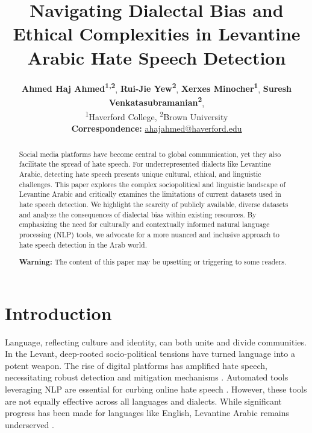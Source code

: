 \documentclass[11pt]{article}
\title{Navigating Dialectal Bias and Ethical Complexities in Levantine Arabic Hate Speech Detection}
\author{
 \textbf{Ahmed Haj Ahmed\textsuperscript{1,2}},
 \textbf{Rui-Jie Yew\textsuperscript{2}},
 \textbf{Xerxes Minocher\textsuperscript{1}},
 \textbf{Suresh Venkatasubramanian\textsuperscript{2}},
\\
 \textsuperscript{1}Haverford College,
 \textsuperscript{2}Brown University
\\
 \small{
   \textbf{Correspondence:} \href{mailto:ahajahmed@haverford.edu}{ahajahmed@haverford.edu}
 }
}
\begin{document}
\maketitle


\begin{abstract}


Social media platforms have become central to global communication, yet they also facilitate the spread of hate speech. For underrepresented dialects like Levantine Arabic, detecting hate speech presents unique cultural, ethical, and linguistic challenges. This paper explores the complex sociopolitical and linguistic landscape of Levantine Arabic and critically examines the limitations of current datasets used in hate speech detection. We highlight the scarcity of publicly available, diverse datasets and analyze the consequences of dialectal bias within existing resources. By emphasizing the need for culturally and contextually informed natural language processing (NLP) tools, we advocate for a more nuanced and inclusive approach to hate speech detection in the Arab world. 

\vspace{0.3em}

\noindent \textbf{Warning:} The content of this paper may be upsetting or triggering to some readers.
\end{abstract}




\section{Introduction}

Language, reflecting culture and identity, can both unite and divide communities. In the Levant, deep-rooted socio-political tensions have turned language into a potent weapon. The rise of digital platforms has amplified hate speech, necessitating robust detection and mitigation mechanisms \citep{CASTANOPULGARIN2021101608, https://doi.org/10.1002/1944-2866.POI364}. Automated tools leveraging NLP are essential for curbing online hate speech \citep{JAHAN2023126232}. However, these tools are not equally effective across all languages and dialects. While significant progress has been made for languages like English, Levantine Arabic remains underserved \citep{bender2019rule}.
\end{document}
